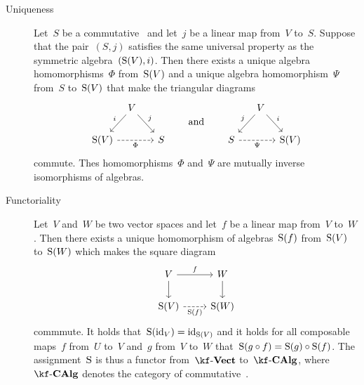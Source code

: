 \begin{recall}
\begin{description}
    \item[Uniqueness]
      Let~$S$ be a commutative~{\algebra{$\kf$}} and let~$j$ be a linear map from~$V$ to~$S$.
      Suppose that the pair~$(S, j)$ satisfies the same universal property as the symmetric algebra~$(\operatorname{S}(V), i)$.
      Then there exists a unique algebra homomorphisms~$\Phi$ from~$\operatorname{S}(V)$ and a unique algebra homomorphism~$\Psi$ from~$S$ to~$\operatorname{S}(V)$ that make the triangular diagrams
      \[
        \begin{tikzcd}[column sep = {3em,between origins}]
          {}
          &
          V
          \arrow{dl}[above left]{i}
          \arrow{dr}[above right]{j}
          &
          {}
          \\
          \Symm(V)
          \arrow[dashed]{rr}[below]{\Phi}
          &
          {}
          &
          S
        \end{tikzcd}
        \qquad\text{and}\qquad
        \begin{tikzcd}[column sep = {3em,between origins}]
          {}
          &
          V
          \arrow{dl}[above left]{j}
          \arrow{dr}[above right]{i}
          &
          {}
          \\
          S
          \arrow[dashed]{rr}[below]{\Psi}
          &
          {}
          &
          \Symm(V)
        \end{tikzcd}
      \]
      commute.
      Thes homomorphisms~$\Phi$ and~$\Psi$ are mutually inverse isomorphisms of algebras.
      
    \item[Functoriality]
      Let~$V$ and~$W$ be two vector spaces and let~$f$ be a linear map from~$V$ to~$W$.
      Then there exists a unique homomorphism of algebras~$\operatorname{S}(f)$ from~$\operatorname{S}(V)$ to~$\operatorname{S}(W)$ which makes the square diagram
      \[
        \begin{tikzcd}
          V
          \arrow{r}[above]{f}
          \arrow{d}
          &
          W
          \arrow{d}
          \\
          \Symm(V)
          \arrow[dashed]{r}[below]{\Symm(f)}
          &
          \Symm(W)
        \end{tikzcd}
      \]
      commmute.
      It holds that~$\operatorname{S}(\mathrm{id}_V) = \mathrm{id}_{\operatorname{S}(V)}$ and it holds for all composable~{\linear{$\kf$}} maps~$f$ from~$U$ to~$V$ and~$g$ from~$V$ to~$W$ that~$\operatorname{S}(g \circ f) = \operatorname{S}(g) \circ \operatorname{S}(f)$.
      The assignment~$\operatorname{S}$ is thus a functor from~$\cVect{\kf}$ to~$\cCAlg{\kf}$, where~$\cCAlg{\kf}$ denotes the category of commutative~{\algebras{$\kf$}}.
      

\end{description}
\end{recall}
